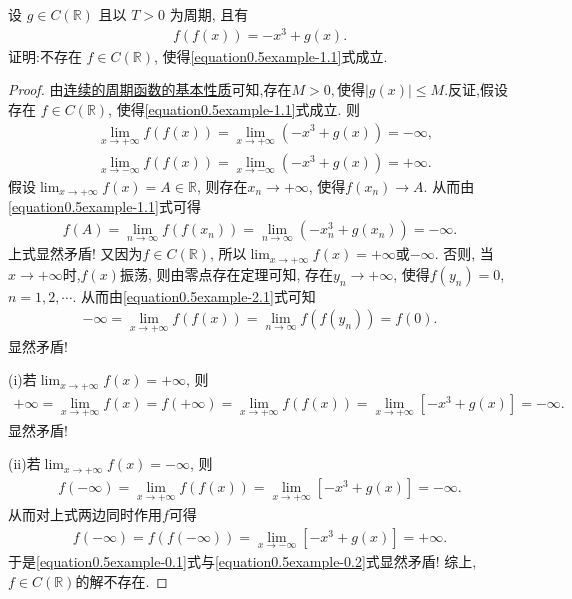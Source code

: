 \documentclass[../../main.tex]{subfiles}
\begin{document}
\begin{example}
设 \(g\in C(\mathbb{R})\) 且以 \(T > 0\) 为周期, 且有
\begin{align}
f(f(x))=-x^3 + g(x).\label{equation0.5example-1.1}
\end{align}
证明:不存在 \(f\in C(\mathbb{R})\), 使得\eqref{equation0.5example-1.1}式成立. 
\end{example}
\begin{proof}
由\hyperref[proposition:连续的周期函数的基本性质]{连续的周期函数的基本性质}可知,存在$M>0,$使得$|g(x)|\leqslant M.$反证,假设存在 \(f\in C(\mathbb{R})\), 使得\eqref{equation0.5example-1.1}式成立. 则
\begin{align}
&\underset{x\rightarrow +\infty}{\lim}f\left( f\left( x \right) \right) =\underset{x\rightarrow +\infty}{\lim}\left( -x^3+g\left( x \right) \right) =-\infty ,\label{equation0.5example-2.1}
\\
&\underset{x\rightarrow -\infty}{\lim}f\left( f\left( x \right) \right) =\underset{x\rightarrow -\infty}{\lim}\left( -x^3+g\left( x \right) \right) =+\infty .\label{equation0.5example-2.2}
\end{align}
假设\(\lim_{x\rightarrow +\infty}f(x) = A\in \mathbb{R}\), 则存在\(x_n\rightarrow +\infty\), 使得\(f(x_n)\rightarrow A\). 从而由\eqref{equation0.5example-1.1}式可得
\begin{align*}
f(A) = \lim_{n\rightarrow \infty}f(f(x_n)) = \lim_{n\rightarrow \infty}(-x_{n}^{3}+g(x_n)) = -\infty.
\end{align*}
上式显然矛盾! 又因为\(f\in C(\mathbb{R})\), 所以\(\lim_{x\rightarrow +\infty}f(x) = +\infty\)或\(-\infty\).
否则, 当\(x\rightarrow +\infty\)时,\(f(x)\)振荡, 则由零点存在定理可知, 存在\(y_n\rightarrow +\infty\), 使得\(f(y_n) = 0\), \(n = 1,2,\cdots\).
从而由\eqref{equation0.5example-2.1}式可知
\begin{align*}
-\infty = \lim_{x\rightarrow +\infty}f(f(x)) = \lim_{n\rightarrow \infty}f(f(y_n)) = f(0).
\end{align*}
显然矛盾!

(i)若\(\lim_{x\rightarrow +\infty}f(x) = +\infty\), 则
\begin{align*}
+\infty = \lim_{x\rightarrow +\infty}f(x) = f(+\infty) = \lim_{x\rightarrow +\infty}f(f(x)) = \lim_{x\rightarrow +\infty}[-x^3 + g(x)] = -\infty.
\end{align*}
显然矛盾!

(ii)若\(\lim_{x\rightarrow +\infty}f(x) = -\infty\), 则
\begin{align}
f(-\infty) = \lim_{x\rightarrow +\infty}f(f(x)) = \lim_{x\rightarrow +\infty}[-x^3 + g(x)] = -\infty. \label{equation0.5example-0.1}
\end{align}
从而对上式两边同时作用\(f\)可得
\begin{align}
f(-\infty) = f(f(-\infty)) = \lim_{x\rightarrow -\infty}[-x^3 + g(x)] = +\infty. \label{equation0.5example-0.2}
\end{align}
于是\eqref{equation0.5example-0.1}式与\eqref{equation0.5example-0.2}式显然矛盾!
综上,\(f\in C(\mathbb{R})\)的解不存在. 

\end{proof}
\end{document}
